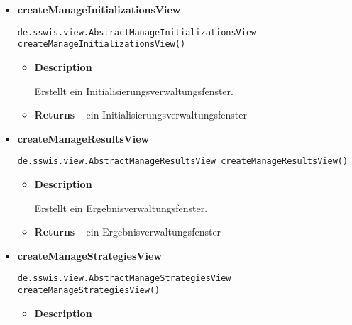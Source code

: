 {{{{\begin{itemize}
{\begin{itemize}
{Erstellt ein Spieleverwaltungsfenster.
}
\item{{\bf  Returns} -- 
ein Spieleverwaltungsfenster 
}%
\end{itemize}
}%
\item{ 
\hypertarget{de.sswis.controller.AbstractGuiFactory.createManageInitializationsView()}{{\bf  createManageInitializationsView}\\}
\begin{lstlisting}[frame=none]
de.sswis.view.AbstractManageInitializationsView createManageInitializationsView()\end{lstlisting} %
\begin{itemize}
\item{
{\bf  Description}

Erstellt ein Initialisierungsverwaltungsfenster.
}
\item{{\bf  Returns} -- 
ein Initialisierungsverwaltungsfenster 
}%
\end{itemize}
}%
\item{ 
\hypertarget{de.sswis.controller.AbstractGuiFactory.createManageResultsView()}{{\bf  createManageResultsView}\\}
\begin{lstlisting}[frame=none]
de.sswis.view.AbstractManageResultsView createManageResultsView()\end{lstlisting} %
\begin{itemize}
\item{
{\bf  Description}

Erstellt ein Ergebnisverwaltungsfenster.
}
\item{{\bf  Returns} -- 
ein Ergebnisverwaltungsfenster 
}%
\end{itemize}
}%
\item{ 
\hypertarget{de.sswis.controller.AbstractGuiFactory.createManageStrategiesView()}{{\bf  createManageStrategiesView}\\}
\begin{lstlisting}[frame=none]
de.sswis.view.AbstractManageStrategiesView createManageStrategiesView()\end{lstlisting} %
\begin{itemize}
\item{
{\bf  Description}

}
\end{itemize}}
\end{itemize}}}}}
